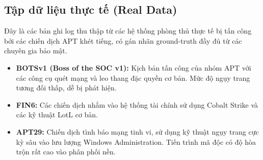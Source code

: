 \documentclass[../main.tex]{subfiles}
\begin{document}
\subsection{Tập dữ liệu thực tế (Real Data)}
Đây là các bản ghi log thu thập từ các hệ thống phòng thủ thực tế bị tấn công bởi các chiến dịch APT khét tiếng, có gán nhãn ground-truth đầy đủ từ các chuyên gia bảo mật.
\begin{itemize}
    \item \textbf{BOTSv1 (Boss of the SOC v1):} Kịch bản tấn công của nhóm APT với các công cụ quét mạng và leo thang đặc quyền cơ bản. Mức độ ngụy trang tương đối thấp, dễ bị phát hiện.
    \item \textbf{FIN6:} Các chiến dịch nhắm vào hệ thống tài chính sử dụng Cobalt Strike và các kỹ thuật LotL cơ bản.
    \item \textbf{APT29:} Chiến dịch tình báo mạng tinh vi, sử dụng kỹ thuật ngụy trang cực kỳ sâu vào lưu lượng Windows Administration. Tiến trình mã độc có độ hòa trộn rất cao vào phân phối nền.
\end{itemize}
\end{document}
